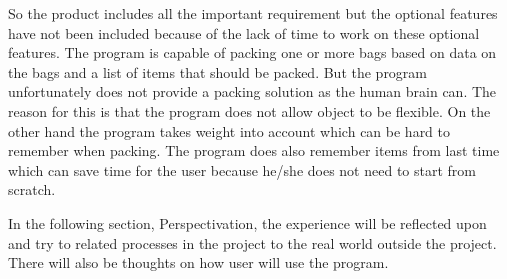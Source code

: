 So the product includes all the important requirement but the optional features have not been included because of the lack of time to work on these optional features. The program is capable of packing one or more bags based on data on the bags and a list of items that should be packed. But the program unfortunately does not provide a packing solution as the human brain can. The reason for this is that the program does not allow object to be flexible. On the other hand the program takes weight into account which can be hard to remember when packing. The program does also remember items from last time which can save time for the user because he/she does not need to start from scratch.

In the following section, Perspectivation, the experience will be reflected upon and try to related processes in the project to the real world outside the project. There will also be thoughts on how user will use the program.